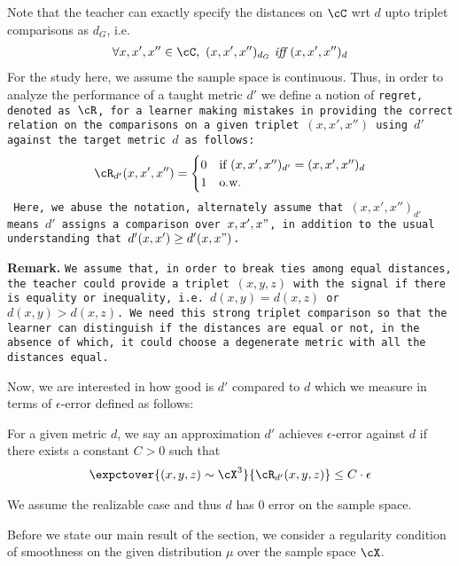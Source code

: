 Note that the teacher can exactly specify the distances on $\cC$ wrt $d$ upto triplet comparisons as $d_G$, i.e.
\begin{align*}
    \forall x, x',x'' \in \cC,\,\, (x,x',x'')_{d_G} \,\,\textit{iff}\,\, (x,x',x'')_{d}
\end{align*}
For the study here, we assume the sample space is continuous. Thus, in order to analyze the performance of a taught metric $d'$ we define a notion of \tt{regret}, denoted as $\cR$, for a learner making mistakes in providing the correct relation on the comparisons on a given triplet $(x, x',x'')$ using $d'$ against the target metric $d$ as follows:
\begin{align*}
    \cR_{d'}(x, x',x'') = \begin{cases}
        0 & \textnormal{if } (x, x',x'')_{d'} = (x, x',x'')_{d}\\
        1 & \textnormal{o.w.}
    \end{cases}
\end{align*}
Here, we abuse the notation, alternately assume that $(x, x',x'')_{d'}$ means $d'$ assigns a comparison over $x,x',x"$, in addition to the usual understanding that $d'(x,x') \ge d'(x,x")$.

\textbf{Remark.} \tt{We assume that, in order to break ties among equal distances, the teacher could provide a triplet $(x,y,z)$ with the signal if there is equality or inequality, i.e. $d(x,y) = d(x,z)$ or $d(x,y) > d(x,z)$. We need this strong triplet comparison so that the learner can distinguish if the distances are equal or not, in the absence of which, it could choose a degenerate metric with all the distances equal.}

Now, we are interested in how good is $d'$ compared to $d$ which we measure in terms of $\epsilon$-error defined as follows: 
\begin{definition}
    For a given metric $d$, we say an approximation $d'$ achieves $\epsilon$-error against $d$ if 
    there exists a constant $C > 0$ such that
\begin{align*}
    \expctover{(x,y,z) \sim \cX^3}{\cR_{d'}(x,y,z)} \le C\cdot\epsilon
\end{align*}
    
\end{definition}
We assume the realizable case and thus $d$ has $0$ error on the sample space. 

Before we state our main result of the section, we consider a regularity condition of smoothness on the given distribution $\mu$ over the sample space $\cX$. 


